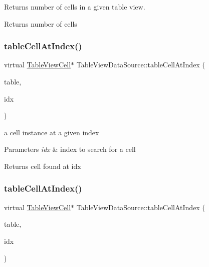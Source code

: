 Returns number of cells in a given table view.

\begin{DoxyReturn}{Returns}
number of cells 
\end{DoxyReturn}
\mbox{\label{classTableViewDataSource_a99fb9d2eb387eb2ed83609c923f21fea}} 
\subsubsection{\texorpdfstring{table\+Cell\+At\+Index()}{tableCellAtIndex()}\hspace{0.1cm}{\footnotesize\ttfamily [1/2]}}
{\footnotesize\ttfamily virtual \hyperlink{classTableViewCell}{Table\+View\+Cell}$\ast$ Table\+View\+Data\+Source\+::table\+Cell\+At\+Index (\begin{DoxyParamCaption}\item[{\hyperlink{classTableView}{Table\+View} $\ast$}]{table,  }\item[{ssize\+\_\+t}]{idx }\end{DoxyParamCaption})\hspace{0.3cm}{\ttfamily [pure virtual]}}

a cell instance at a given index


\begin{DoxyParams}{Parameters}
{\em idx} & index to search for a cell \\
\hline
\end{DoxyParams}
\begin{DoxyReturn}{Returns}
cell found at idx 
\end{DoxyReturn}
\mbox{\label{classTableViewDataSource_a99fb9d2eb387eb2ed83609c923f21fea}} 
\subsubsection{\texorpdfstring{table\+Cell\+At\+Index()}{tableCellAtIndex()}\hspace{0.1cm}{\footnotesize\ttfamily [2/2]}}
{\footnotesize\ttfamily virtual \hyperlink{classTableViewCell}{Table\+View\+Cell}$\ast$ Table\+View\+Data\+Source\+::table\+Cell\+At\+Index (\begin{DoxyParamCaption}\item[{\hyperlink{classTableView}{Table\+View} $\ast$}]{table,  }\item[{ssize\+\_\+t}]{idx }\end{DoxyParamCaption})\hspace{0.3cm}{\ttfamily [pure virtual]}}

